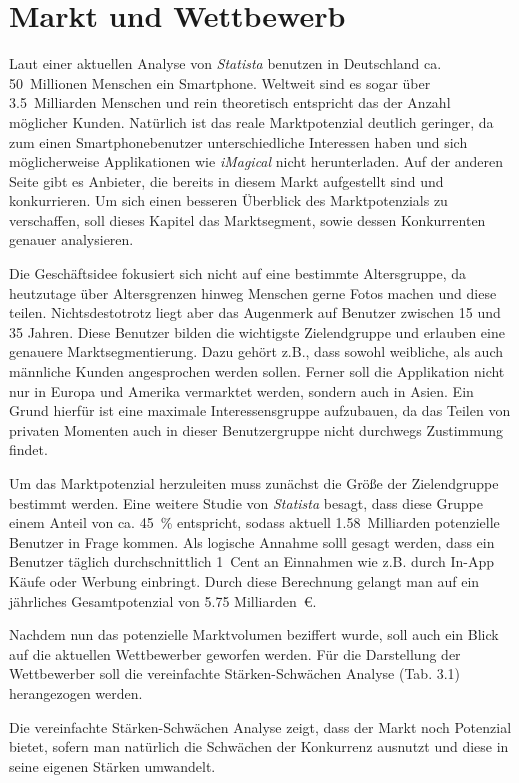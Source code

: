 \chapter{Markt und Wettbewerb}
Laut einer aktuellen Analyse von \textit{Statista} benutzen in Deutschland ca. 50~Millionen Menschen ein Smartphone. Weltweit sind es sogar über 3.5~Milliarden Menschen und rein theoretisch entspricht das der Anzahl möglicher Kunden. Natürlich ist das reale Marktpotenzial deutlich geringer, da zum einen Smartphonebenutzer unterschiedliche Interessen haben und sich möglicherweise Applikationen wie \textit{iMagical} nicht herunterladen. Auf der anderen Seite gibt es Anbieter, die bereits in diesem Markt aufgestellt sind und konkurrieren. Um sich einen besseren Überblick des Marktpotenzials zu verschaffen, soll dieses Kapitel das Marktsegment, sowie dessen Konkurrenten genauer analysieren.

Die Geschäftsidee fokusiert sich nicht auf eine bestimmte Altersgruppe, da heutzutage über Altersgrenzen hinweg Menschen gerne Fotos machen und diese teilen. Nichtsdestotrotz liegt aber das Augenmerk auf Benutzer zwischen 15 und 35 Jahren. Diese Benutzer bilden die wichtigste Zielendgruppe und erlauben eine genauere Marktsegmentierung. Dazu gehört z.B., dass sowohl weibliche, als auch männliche Kunden angesprochen werden sollen. Ferner soll die Applikation nicht nur in Europa und Amerika vermarktet werden, sondern auch in Asien. Ein Grund hierfür ist eine maximale Interessensgruppe aufzubauen, da das Teilen von privaten Momenten auch in dieser Benutzergruppe nicht durchwegs Zustimmung findet.

Um das Marktpotenzial herzuleiten muss zunächst die Größe der Zielendgruppe bestimmt werden. Eine weitere Studie von \textit{Statista} besagt, dass diese Gruppe einem Anteil von ca. 45~\% entspricht, sodass aktuell 1.58~Milliarden potenzielle Benutzer in Frage kommen. Als logische Annahme solll gesagt werden, dass ein Benutzer täglich durchschnittlich 1~Cent an Einnahmen wie z.B. durch In-App Käufe oder Werbung einbringt. Durch diese Berechnung gelangt man auf ein jährliches Gesamtpotenzial von 5.75 Milliarden~€.

Nachdem nun das potenzielle Marktvolumen beziffert wurde, soll auch ein Blick auf die aktuellen Wettbewerber geworfen werden. Für die Darstellung der Wettbewerber soll die vereinfachte Stärken-Schwächen Analyse (Tab. 3.1) herangezogen werden.

Die vereinfachte Stärken-Schwächen Analyse zeigt, dass der Markt noch Potenzial bietet, sofern man natürlich die Schwächen der Konkurrenz ausnutzt und diese in seine eigenen Stärken umwandelt.


